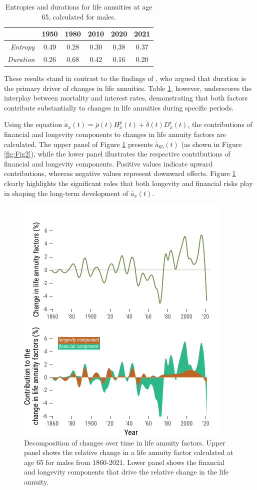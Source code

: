 \documentclass[12pt]{article}
\begin{document}
{\begin{table}[ht]
\begin{tabular}{rccccc}
		& \textbf{1950} & \textbf{1980} & \textbf{2010 }& \textbf{2020} & \textbf{2021} \\
\hline
	\textit{Entropy} &  0.49    & 0.28     & 0.30     &   0.38 & 0.37  \\
	
		\textit{Duration} &  0.26    & 0.68     &  0.42    &     0.16 & 0.20\\
\bottomrule
	\end{tabular}
	 \caption{Entropies and durations for life annuities at age 65, calculated for males.}
	\label{tab:entropyDuration}   
\end{table}

These results stand in contrast to the findings of \citet{rabitti2020mortality}, who argued that duration is the primary driver of changes in life annuities. Table \ref{tab:entropyDuration}, however, underscores the interplay between mortality and interest rates, demonstrating that both factors contribute substantially to changes in life annuities during specific periods.

Using the equation \( \acute{\bar{a}}_x(t) = \bar{\rho}(t) {H}^{p}_x(t) + \dot{\delta}(t) D^{c}_x(t) \), the contributions of financial and longevity components to changes in life annuity factors are calculated. The upper panel of Figure \ref{fig:Fig4} presents \( \acute{\bar{a}}_{65}(t) \) (as shown in Figure \ref{fig:Fig2}), while the lower panel illustrates the respective contributions of financial and longevity components. Positive values indicate upward contributions, whereas negative values represent downward effects. Figure \ref{fig:Fig4} clearly highlights the significant roles that both longevity and financial risks play in shaping the long-term development of \( \bar{a}_x(t) \).


\begin{figure}[H]
	\centering
	\includegraphics[width=0.5\linewidth]{Fig/decompositionLongTermSingleInterestRates}
	\caption{{Decomposition of changes over time in life annuity factors. Upper panel shows the relative change in a life annuity factor calculated at age 65 for males from 1860-2021. Lower panel shows the financial and longevity components that drive the relative change in the life annuity. }}
	\label{fig:Fig4}
\end{figure}

}
\end{document}
